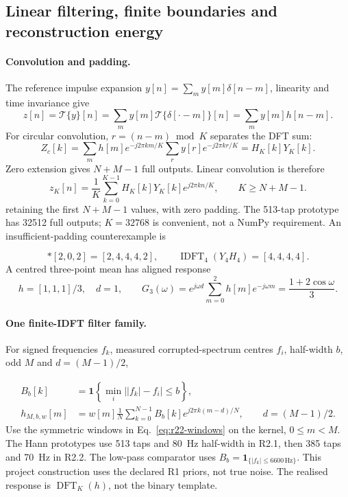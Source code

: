 \subsection{Linear filtering, finite boundaries and reconstruction energy}
\label{app:filter}
\paragraph{Convolution and padding.}
The reference impulse expansion $y[n]=\sum_my[m]\delta[n-m]$, linearity
and time invariance give 
\begin{equation}
 z[n]=\mathcal T\{y\}[n]=\sum_my[m]\mathcal T\{\delta[\cdot-m]\}[n]
 =\sum_my[m]h[n-m].
 \label{eq:r21-lti-convolution}
\end{equation}
For circular convolution, $r=(n-m)\bmod K$ separates the DFT sum:
\begin{equation}
 Z_c[k]=\sum_mh[m]e^{-j2\pi km/K}\sum_ry[r]e^{-j2\pi kr/K}
 =H_K[k]Y_K[k].
 \label{eq:r21-convolution-theorem}
\end{equation}
Zero extension gives $N+M-1$ full outputs. Linear convolution is therefore
\begin{equation}
 z_K[n]=\frac1K\sum_{k=0}^{K-1}H_K[k]Y_K[k]e^{j2\pi kn/K},
 \qquad K\ge N+M-1.
 \label{eq:r21-padded-convolution}
\end{equation}
retaining the first $N+M-1$ values, with zero padding.
The 513-tap prototype has 32512 full outputs; $K=32768$ is convenient,
not a NumPy requirement. An insufficient-padding counterexample is

\begin{equation}
 [1,2,1]*[2,0,2]=[2,4,4,4,2],
 \qquad
 \operatorname{IDFT}_4(Y_4H_4)=[4,4,4,4].
 \label{eq:r21-wrap-example}
\end{equation}
A centred three-point mean has aligned response
\begin{equation}
 h=[1,1,1]/3,\quad d=1,\qquad
 G_3(\omega)=e^{j\omega d}\sum_{m=0}^2h[m]e^{-j\omega m}
 =\frac{1+2\cos\omega}{3}.
 \label{eq:r21-ma-response}
\end{equation}

\paragraph{One finite-IDFT filter family.}
For signed frequencies $f_k$, measured corrupted-spectrum centres $f_i$,
half-width $b$, odd $M$ and $d=(M-1)/2$,

\begin{align}
 B_b[k]&=\mathbf1\!\left\{\min_i\bigl||f_k|-f_i\bigr|\le b\right\},\\
 h_{M,b,w}[m]&=w[m]\frac1N\sum_{k=0}^{N-1}
 B_b[k]e^{j2\pi k(m-d)/N},\qquad d=(M-1)/2.
 \label{eq:r22-family}
\end{align}
Use the symmetric windows in Eq.~\eqref{eq:r22-windows} on the kernel,
$0\le m<M$. The Hann prototypes use 513 taps and 80~Hz half-width in R2.1,
then 385 taps and 70~Hz in R2.2. The low-pass comparator uses
$B_b=\mathbf1_{\{|f_k|\le6600\,\mathrm{Hz}\}}$.
This project construction uses the declared R1 priors, not true noise.
The realised response is $\operatorname{DFT}_K(h)$, not the binary template.

